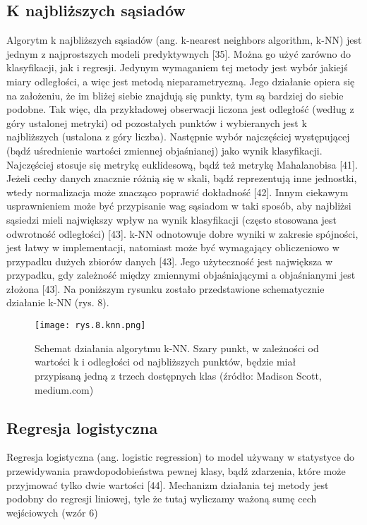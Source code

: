 \subsection{K najbliższych sąsiadów}
\label{cha:K najbliższych sąsiadów}

Algorytm k najbliższych sąsiadów (ang. k-nearest neighbors algorithm, k-NN) jest jednym z najprostszych modeli predyktywnych [35]. Można go użyć zarówno do klasyfikacji, jak i regresji. Jedynym wymaganiem tej metody jest wybór jakiejś miary odległości, a więc jest metodą nieparametryczną. Jego działanie opiera się na założeniu, że im bliżej siebie znajdują się punkty, tym są bardziej do siebie podobne. Tak więc, dla przykładowej obserwacji liczona jest odległość (według z góry ustalonej metryki) od pozostałych punktów i wybieranych jest k najbliższych (ustalona z góry liczba). Następnie wybór najczęściej występującej (bądź uśrednienie wartości zmiennej objaśnianej) jako wynik klasyfikacji. Najczęściej stosuje się metrykę euklidesową, bądź też metrykę Mahalanobisa [41]. Jeżeli cechy danych znacznie różnią się w skali, bądź reprezentują inne jednostki, wtedy normalizacja może znacząco poprawić dokładność [42]. Innym ciekawym usprawnieniem może być przypisanie wag sąsiadom w taki sposób, aby najbliżsi sąsiedzi mieli największy wpływ na wynik klasyfikacji (często stosowana jest odwrotność odległości) [43]. k-NN odnotowuje dobre wyniki w zakresie spójności, jest łatwy w implementacji, natomiast może być wymagający obliczeniowo w przypadku dużych zbiorów danych [43]. Jego użyteczność jest największa w przypadku, gdy zależność między zmiennymi objaśniającymi a objaśnianymi jest złożona [43]. Na poniższym rysunku zostało przedstawione schematycznie działanie k-NN (rys. 8). 



\begin{figure}[h]
    \centering
    \texttt{[image: rys.8.knn.png]}
    \caption{Schemat działania algorytmu k-NN. Szary punkt, w zależności od wartości k i odległości od najbliższych punktów, będzie miał przypisaną jedną z trzech dostępnych klas (źródło: Madison Scott, medium.com)}
    \label{fig:mesh8}
\end{figure}

\subsection{Regresja logistyczna}
\label{Regresja logistyczna}

Regresja logistyczna (ang. logistic regression) to model używany w statystyce do przewidywania prawdopodobieństwa pewnej klasy, bądź zdarzenia, które może przyjmować tylko dwie wartości [44]. Mechanizm działania tej metody jest podobny do regresji liniowej, tyle że tutaj wyliczamy ważoną sumę cech wejściowych (wzór 6)




